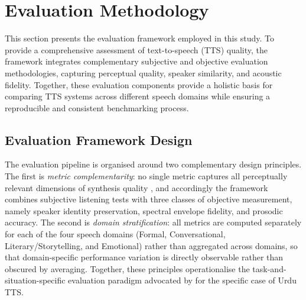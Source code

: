 \documentclass[a4paper,fleqn]{cas-dc}
\begin{document}
    
    
    
    \section{Evaluation Methodology}\label{sec:methodology}

    This section presents the evaluation framework employed in this study. To provide a comprehensive assessment of text-to-speech (TTS) quality, the framework integrates complementary subjective and objective evaluation methodologies, capturing perceptual quality, speaker similarity, and acoustic fidelity. Together, these evaluation components provide a holistic basis for comparing TTS systems across different speech domains while ensuring a reproducible and consistent benchmarking process.

    \subsection{Evaluation Framework Design}\label{sec:methodology-framework}
    
    The evaluation pipeline is organised around two complementary design
    principles. The first is \emph{metric complementarity}: no single metric
    captures all perceptually relevant dimensions of synthesis quality
    \citep{kirkland2023mos,lemaguer2024limits}, and accordingly the framework
    combines subjective listening tests with three classes of objective
    measurement, namely speaker identity preservation, spectral envelope
    fidelity, and prosodic accuracy. The second is \emph{domain stratification}:
    all metrics are computed separately for each of the four speech domains
    (Formal, Conversational, Literary/Storytelling, and Emotional)
    rather than aggregated across domains, so that domain-specific performance
    variation is directly observable rather than obscured by averaging. Together,
    these principles operationalise the task-and-situation-specific evaluation
    paradigm advocated by \citet{bailly2025hot} for the specific case of Urdu TTS.
    
\end{document}

